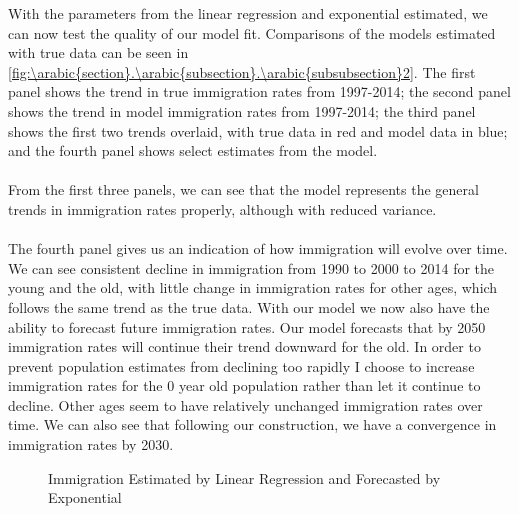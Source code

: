 \documentclass[10pt]{article}
\renewcommand{\thesection}{\arabic{section}}
\renewcommand{\thesubsection}{\thesection.\arabic{subsection}}
\renewcommand{\thesubsubsection}{\thesubsection.\arabic{subsubsection}}
\numberwithin{equation}{subsection}
\newcommand*{\FigureDir}{../../graphs}
\begin{document}
\begin{appendices}
\noindent
With the parameters from the linear regression and exponential estimated, we can now test the quality of our model fit. Comparisons of the models estimated with true data can be seen in \autoref{fig:\thesubsubsection2}. The first panel shows the trend in true immigration rates from 1997-2014; the second panel shows the trend in model immigration rates from 1997-2014; the third panel shows the first two trends overlaid, with true data in red and model data in blue; and the fourth panel shows select estimates from the model.
\\\\
From the first three panels, we can see that the model represents the general trends in immigration rates properly, although with reduced variance. 
\\\\
The fourth panel gives us an indication of how immigration will evolve over time. We can see consistent decline in immigration from 1990 to 2000 to 2014 for the young and the old, with little change in immigration rates for other ages, which follows the same trend as the true data. With our model we now also have the ability to forecast future immigration rates. Our model forecasts that by 2050 immigration rates will continue their trend downward for the old. In order to prevent population estimates from declining too rapidly I choose to increase immigration rates for the 0 year old population rather than let it continue to decline. Other ages seem to have relatively unchanged immigration rates over time. We can also see that following our construction, we have a convergence in immigration rates by 2030.

\begin{figure}[H]
   \centering
   \caption{\label{fig:\thesubsubsection2}Immigration Estimated by Linear Regression and Forecasted by Exponential}
\end{figure}


\end{appendices}
\end{document}
